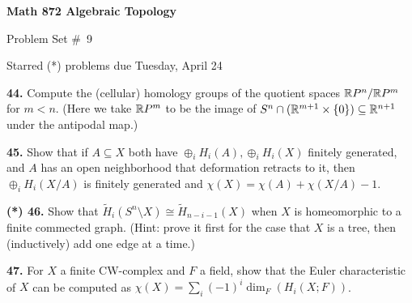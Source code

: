 

\overfullrule=0pt
\parindent=0pt
\nopagenumbers




\loadmsbm

\def\ctln{\centerline}
\def\u{\underbar}
\def\ssk{\smallskip}
\def\msk{\medskip}
\def\bsk{\bigskip}
\def\hsk{\hskip.1in}
\def\hhsk{\hskip.2in}

\def\dsl{\displaystyle}
\def\hskp{\hskip1.5in}
\def\ra{\rightarrow}
\def\lra{$\Leftrightarrow$}
\def\pu{\pi_1}
\def\mpu{$\pi_1$}
\def\bra{$\Rightarrow$}
\def\bbr{{\Bbb R}}
\def\bbz{{\Bbb Z}}
\def\bbq{{\Bbb Q}}
\def\del{\partial}
\def\indt{\item{}}
\def\wtl{\widetilde}
\def\coker{\text{coker}}
\def\im{\text{im}}
\def\wtih{\widetilde{H}}

\ctln{\bf Math 872 Algebraic Topology}

\ssk

\ctln{Problem Set \#\ 9}

\ssk

\ctln{Starred (*) problems due Tuesday, April 24}

\bsk

\item{\bf 44.} Compute the (cellular) homology groups of the quotient
spaces $\bbr P^n/\bbr P^m$ for $m<n$. (Here we take $\bbr P^m$ to be the
image of $S^n\cap(\bbr^{m+1}\times\{0\})\subseteq \bbr^{n+1}$ under the antipodal map.)

\msk

\item{\bf 45.} Show that if $A\subseteq X$ both have $\oplus_i H_i(A),\oplus_i H_i(X)$
finitely generated, and $A$ has an open neighborhood that deformation retracts to it, then
$\oplus_i H_i(X/A)$ is finitely generated and $\chi(X)=\chi(A) + \chi(X/A)-1$.

\msk

\item{\bf (*) 46.} Show that $\wtih_i(S^n\setminus X)\cong \wtih_{n-i-1}(X)$ when $X$ is homeomorphic to a
finite commected graph. (Hint: prove it first for the case that $X$ is a tree, then (inductively)
add one edge at a time.)

\msk

\item{\bf 47.} For $X$ a finite CW-complex and $F$ a field, show that the Euler characteristic
of $X$ can be computed as $\chi(X) = \sum_i (-1)^i\dim_F(H_i(X;F))$.

\msk

